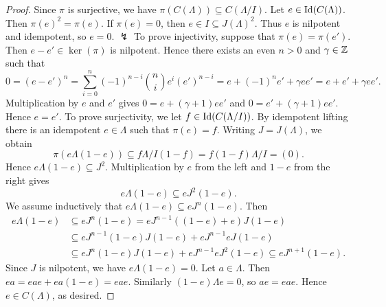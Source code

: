 \begin{proof}
Since $\pi$ is surjective, we have $\pi(C(\Lambda))\subseteq C(\Lambda/I)$. Let $e\in\operatorname{Id}(C(\Lambda))$. Then $\pi(e)^2=\pi(e)$. If $\pi(e)=0$, then $e\in I\subseteq J(\Lambda)^2$. Thus $e$ is nilpotent and idempotent, so $e=0$. $\lightning$ To prove injectivity, suppose that $\pi(e)=\pi(e')$. Then $e-e'\in\ker(\pi)$ is nilpotent. Hence there exists an even $n>0$ and $\gamma\in\mathbb{Z}$ such that
\[
0 = (e-e')^n
  = \sum_{i=0}^n (-1)^{n-i} \binom{n}{i} e^i (e')^{n-i}
  = e + (-1)^n e' + \gamma ee'
  = e + e' + \gamma ee'.
\]
Multiplication by $e$ and $e'$ gives $0=e+(\gamma+1)ee'$ and $0=e'+(\gamma+1)ee'$. Hence $e=e'$. To prove surjectivity, we let $f\in \operatorname{Id}(C(\Lambda/I))$. By idempotent lifting there is an idempotent $e\in\Lambda$ such that $\pi(e)=f$. Writing $J=J(\Lambda)$, we obtain
\[
\pi(e\Lambda(1-e)) \subseteq f \Lambda/I (1-f) = f(1-f)\Lambda/I = (0).
\]
Hence $e\Lambda(1-e)\subseteq J^2$. Multiplication by $e$ from the left and $1-e$ from the right gives
\[
e\Lambda(1-e) \subseteq eJ^2(1-e).
\]
We assume inductively that $e\Lambda(1-e) \subseteq eJ^n(1-e)$. Then
\begin{align*}
e\Lambda(1-e)
& \subseteq eJ^n(1-e)
  = eJ^{n-1}((1-e)+e)J(1-e) \\
& \subseteq eJ^{n-1}(1-e)J(1-e)+eJ^{n-1}eJ(1-e) \\
& \subseteq eJ^n(1-e)J(1-e)+eJ^{n-1}eJ^2(1-e)
  \subseteq eJ^{n+1}(1-e).
\end{align*}
%
Since $J$ is nilpotent, we have $e\Lambda(1-e)=0$. Let $a\in\Lambda$. Then $ea=eae+ea(1-e)=eae$. Similarly $(1-e)\Lambda e=0$, so $ae=eae$. Hence $e\in C(\Lambda)$, as desired.
\end{proof}

